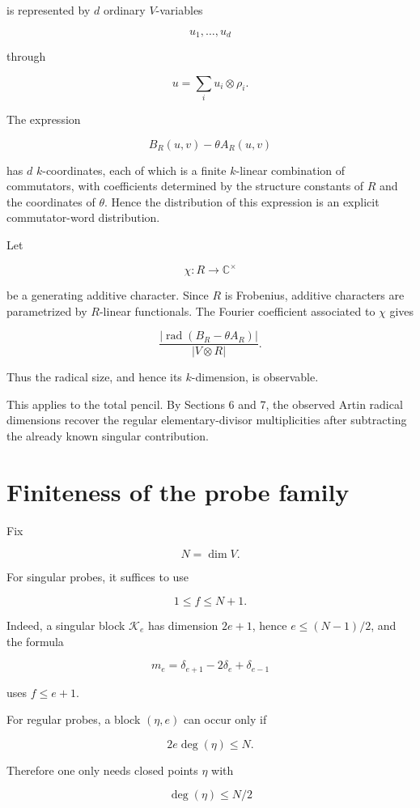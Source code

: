\documentclass[11pt]{article}
\begin{document}
is represented by $d$ ordinary $V$-variables

\[
u_1,\ldots,u_d
\]

through

\[
u=\sum_i u_i\otimes\rho_i.
\]

The expression

\[
B_R(u,v)-\theta A_R(u,v)
\]

has $d$ $k$-coordinates, each of which is a finite $k$-linear combination of commutators, with coefficients determined by the structure constants of $R$ and the coordinates of $\theta$. Hence the distribution of this expression is an explicit commutator-word distribution.

Let

\[
\chi:R\to\mathbb C^\times
\]

be a generating additive character. Since $R$ is Frobenius, additive characters are parametrized by $R$-linear functionals. The Fourier coefficient associated to $\chi$ gives

\[
\frac{|\operatorname{rad}(B_R-\theta A_R)|}{|V\otimes R|}.
\]

Thus the radical size, and hence its $k$-dimension, is observable.

This applies to the total pencil. By Sections 6 and 7, the observed Artin radical dimensions recover the regular elementary-divisor multiplicities after subtracting the already known singular contribution.

\section{Finiteness of the probe family}

Fix

\[
N=\dim V.
\]

For singular probes, it suffices to use

\[
1\le f\le N+1.
\]

Indeed, a singular block $\mathcal K_e$ has dimension $2e+1$, hence $e\le (N-1)/2$, and the formula

\[
m_e=\delta_{e+1}-2\delta_e+\delta_{e-1}
\]

uses $f\le e+1$.

For regular probes, a block $(\eta,e)$ can occur only if

\[
2e\deg(\eta)\le N.
\]

Therefore one only needs closed points $\eta$ with

\[
\deg(\eta)\le N/2
\]
\end{document}
